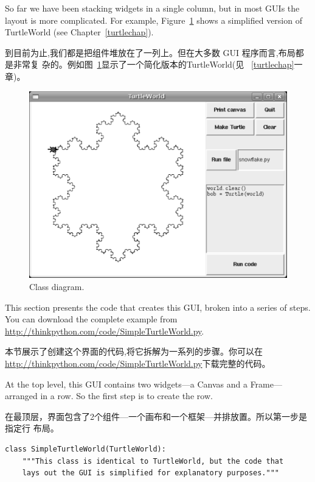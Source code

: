 \documentclass[10pt]{book}
\begin{document}
\begin{CJK}{UTF8}{gbsn}
So far we have been stacking widgets in a single column, but in most
GUIs the layout is more complicated.  For example,
Figure~\ref{fig.turtleworld} shows a simplified version of
TurtleWorld (see Chapter~\ref{turtlechap}).

到目前为止,我们都是把组件堆放在了一列上。但在大多数 GUI 程序而言,布局都是非常复
杂的。例如图~\ref{fig.turtleworld}显示了一个简化版本的TurtleWorld(见
~\ref{turtlechap}一章)。

\begin{figure}
\centerline{\includegraphics[scale=0.5]{figs/TurtleWorld.pdf}}
\caption{Class diagram.}
\label{fig.turtleworld}
\end{figure}


This section presents the code that creates this GUI, broken into a
series of steps.  You can download the complete example
from \url{http://thinkpython.com/code/SimpleTurtleWorld.py}.

本节展示了创建这个界面的代码,将它拆解为一系列的步骤。你可以在
\url{http://thinkpython.com/code/SimpleTurtleWorld.py}下载完整的代码。

At the top level, this GUI contains two widgets---a Canvas and a
Frame---arranged in a row.  So the first step is to create the row.

在最顶层，界面包含了2个组件---一个画布和一个框架---并排放置。所以第一步是指定行
布局。

\begin{verbatim}
class SimpleTurtleWorld(TurtleWorld):
    """This class is identical to TurtleWorld, but the code that
    lays out the GUI is simplified for explanatory purposes."""


\end{verbatim}
\end{CJK}
\end{document}

